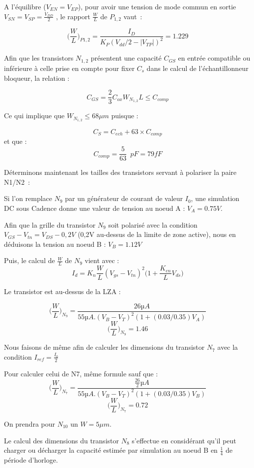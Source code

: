 \documentclass[11pt]{article}
\begin{document}
A l’\'equilibre ($V_{EN} = V_{EP}$), pour avoir une tension de mode commun en sortie
$V_{SN} = V_{SP} = \frac{V_{DD}}{2}$ , le rapport $\frac{W}{L}$ de $P_{1,2}$ vaut :

\[
  \bigg(\frac{W}{L}\bigg)_{P1,2} = \frac{I_D}{K_P (V_{dd}/2 - |V_{TP}|)^{2}} = 1.229
\]

Afin que les transistors $N_{1,2}$ pr\'esentent une capacit\'e $C_{GS}$ en entr\'ee compatible
ou inf\'erieure \`a celle prise en compte pour fixer $C_s$ dans le calcul de l’\'echantillonneur
bloqueur, la relation :

\[
  C_{GS} = \frac{2}{3} C_{ox} W_{N_{1,2}} L \leq C_{comp}
\]

Ce qui implique que $W_{N_{1,2}} \leq 68 \mu m$ puisque :

\[
  C_S = C_{ech} + 63 \times C_{comp}
\]
et que :
\[
  C_{comp} = \frac{5}{63} \phantom{2} pF = 79 fF
\]

D\'eterminons maintenant les tailles des transistors servant \`a polariser la paire N1/N2 :

Si l’on remplace $N_{9}$ par un g\'en\'erateur de courant de valeur $I_{0}$, une simulation DC
sous Cadence donne une valeur de tension au noeud A : $V_A = 0.75 V$.

Afin que la grille du transistor $N_9$ soit polaris\'e avec la condition $V_{GS}-V_{tn}=V_{DS} - 0,2V$
 (0,2V au-dessus de la limite de zone active), nous en d\'eduisons la tension au noeud B : $V_B = 1.12 V$

Puis, le calcul de $\frac{W}{L}$ de $N_9$ vient avec :
\[
  I_d = K_n \frac{W}{L} (V_{gs} - V_{tn})^2 \bigg( 1 + \frac{K_{en}}{L} V_{ds}\bigg)
\]

Le transistor est au-dessus de la LZA :

\[
\bigg(\frac{W}{L} \bigg)_{N_9} = \frac {26µA}{55µA . (V_B - V_T)^2 ( 1+ (0.03/0.35) V_A)}
\]
\[
\bigg(\frac{W}{L} \bigg)_{N_9} = 1.46
\]

Nous faisons de m\^eme afin de calculer les dimensions du transistor $N_7$ avec la condition
$I_{ref} =\frac{I_0}{2}$

Pour calculer celui de N7, m\^eme formule sauf que :
\[
  \bigg(\frac{W}{L} \bigg)_{N_7} = \frac {\frac{26}{2}µA  }{55µA . (V_B - V_T)^2 ( 1+ (0.03/0.35) V_B)}
\]
\[
\bigg(\frac{W}{L} \bigg)_{N_7} = 0.72
\]

On prendra pour $N_{10}$ un $W = 5 \mu m$.

Le calcul des dimensions du transistor $N_8$ s’effectue en consid\'erant qu’il peut charger ou d\'echarger
la capacit\'e estim\'ee par simulation au noeud B en $\frac{1}{4}$ de p\'eriode d’horloge.
\end{document}

